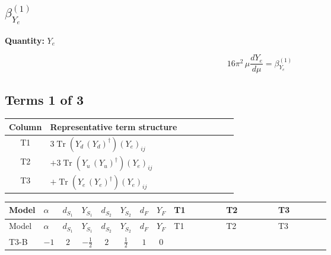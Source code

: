 \documentclass[8pt]{article}
\begin{document}
\begin{landscape}
\section*{$\beta_{Y_e}^{(1)}$}
\noindent\textbf{Quantity: }$Y_e$\par\smallskip
\[16\pi^2\,\mu\frac{d Y_e}{d\mu}=\beta_{Y_e}^{(1)}\]
\subsection*{Terms 1 of 3}
\begin{center}
\begin{tabular}{@{}c >{\raggedright\arraybackslash}p{0.82\linewidth}@{}}
\toprule
Column & Representative term structure \\
\midrule
T1 & \(\displaystyle 3 \operatorname{Tr}\!\left({Y_d}\,\left({Y_d}\right)^{\dagger}\right) \left({Y_e}\right)_{ij}\) \\
\midrule
T2 & \(\displaystyle +3 \operatorname{Tr}\!\left({Y_u}\,\left({Y_u}\right)^{\dagger}\right) \left({Y_e}\right)_{ij}\) \\
\midrule
T3 & \(\displaystyle +\operatorname{Tr}\!\left({Y_e}\,\left({Y_e}\right)^{\dagger}\right) \left({Y_e}\right)_{ij}\) \\
\midrule
\bottomrule
\end{tabular}
\end{center}
\smallskip
\tiny
\begin{longtable}{@{}llcccccc >{\raggedright\arraybackslash}p{0.21\linewidth} >{\raggedright\arraybackslash}p{0.21\linewidth} >{\raggedright\arraybackslash}p{0.21\linewidth}@{}}
\toprule
Model & $\alpha$ & $d_{S_1}$ & $Y_{S_1}$ & $d_{S_2}$ & $Y_{S_2}$ & $d_F$ & $Y_F$ & T1 & T2 & T3 \\
\midrule
\endfirsthead
\toprule
Model & $\alpha$ & $d_{S_1}$ & $Y_{S_1}$ & $d_{S_2}$ & $Y_{S_2}$ & $d_F$ & $Y_F$ & T1 & T2 & T3 \\
\midrule
\endhead
T3-B & $-1$ & $2$ & $-\frac{1}{2}$ & $2$ & $\frac{1}{2}$ & $1$ & $0$ & \scriptsize\adjustbox{max width=\linewidth}{$\begin{gathered} 3 \operatorname{Tr}\!\left({Y_d}\,\left({Y_d}\right)^{\dagger}\right) \left({Y_e}\right)_{ij}\end{gathered}$} & \scriptsize\adjustbox{max width=\linewidth}{$\begin{gathered} +3 \operatorname{Tr}\!\left({Y_u}\,\left({Y_u}\right)^{\dagger}\right) \left({Y_e}\right)_{ij}\end{gathered}$} & \scriptsize\adjustbox{max width=\linewidth}{$\begin{gathered} +\operatorname{Tr}\!\left({Y_e}\,\left({Y_e}\right)^{\dagger}\right) \left({Y_e}\right)_{ij}\end{gathered}$} \\

\end{longtable}
\end{landscape}
\end{document}
